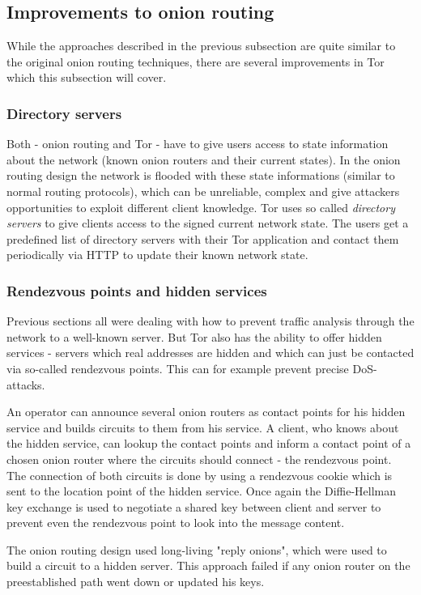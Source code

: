 \subsection{Improvements to onion routing}

While the approaches described in the previous subsection are quite similar to the original onion routing techniques, there are several improvements in Tor which this subsection will cover.

\subsubsection{Directory servers} 
Both - onion routing and Tor - have to give users access to state information about the network (known onion routers and their current states). In the onion routing design the network is flooded with these state informations (similar to normal routing protocols), which can be unreliable, complex and give attackers opportunities to exploit different client knowledge. Tor uses so called \textit{directory servers} to give clients access to the signed current network state. The users get a predefined list of directory servers with their Tor application and contact them periodically via HTTP to update their known network state.

\subsubsection{Rendezvous points and hidden services} 
Previous sections all were dealing with how to prevent traffic analysis through the network to a well-known server. But Tor also has the ability to offer hidden services - servers which real addresses are hidden and which can just be contacted via so-called rendezvous points. This can for example prevent precise DoS-attacks.

An operator can announce several onion routers as contact points for his hidden service and builds circuits to them from his service. A client, who knows about the hidden service, can lookup the contact points and inform a contact point of a chosen onion router where the circuits should connect - the rendezvous point. The connection of both circuits is done by using a rendezvous cookie which is sent to the location point of the hidden service. Once again the Diffie-Hellman key exchange is used to negotiate a shared key between client and server to prevent even the rendezvous point to look into the message content.

The onion routing design used long-living "reply onions", which were used to build a circuit to a hidden server. This approach failed if any onion router on the preestablished path went down or updated his keys.

